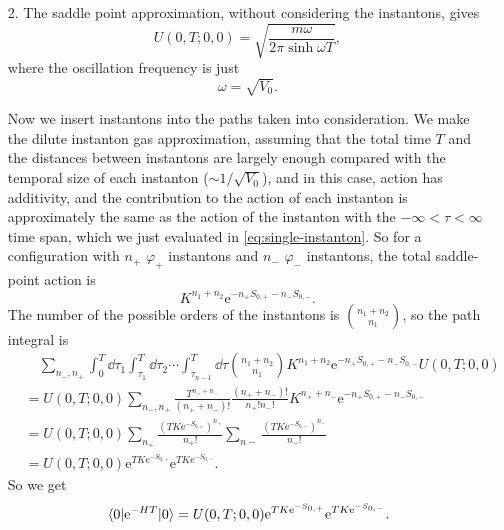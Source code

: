 \documentclass[hyperref, a4paper]{article}
\newcommand*{\ee}{\mathrm{e}}
\begin{document}
\begin{itemize}
\item[2.] The saddle point approximation, without considering the instantons, gives 
\begin{equation}
    U(0, T; 0, 0) = \sqrt{\frac{m \omega}{2 \pi \sinh \omega T}},
\end{equation}
where the oscillation frequency is just 
\begin{equation}
    \omega = \sqrt{V_0}.
\end{equation}

Now we insert instantons into the paths taken into consideration.
We make the dilute instanton gas approximation,
assuming that the total time $T$ and the distances between instantons 
are largely enough compared with the temporal size of each instanton ($\sim 1 / \sqrt{V_0}$),
and in this case, action has additivity,
and the contribution to the action of each instanton 
is approximately the same as the action of the instanton with
the $-\infty < \tau < \infty$ time span,
which we just evaluated in \eqref{eq:single-instanton}.
So for a configuration with $n_+$ $\varphi_+$ instantons and $n_-$ $\varphi_-$ instantons,
the total saddle-point action is 
\[
    K^{n_1 + n_2} \ee^{- n_+ S_{0, +} - n_- S_{0, -}}.
\]
The number of the possible orders of the instantons is $\binom{n_1 + n_2}{n_1}$,
so the path integral is 
\[
    \begin{aligned}
        &\quad \sum_{n_-, n_+} 
        \int_{0}^T \dd{\tau_1} \int_{\tau_1}^T \dd{\tau_2} \cdots \int_{\tau_{n-1}}^T \dd{\tau}
        \binom{n_1 + n_2}{n_1} K^{n_1 + n_2} \ee^{- n_+ S_{0, +} - n_- S_{0, -}}
        U(0, T; 0, 0) \\
        &= U(0, T; 0, 0) \sum_{n_-, n_+} \frac{T^{n_+ + n_-}}{(n_+ + n_-) !} 
        \frac{(n_+ + n_-) !}{n_+! n_-!} 
        K^{n_+ + n_-} \ee^{- n_+ S_{0, +} - n_- S_{0, -}} \\
        &= U(0, T; 0, 0) \sum_{n_+} \frac{(T K \ee^{- S_{0, +}})^{n_+}}{n_+!} 
        \sum_{n-} \frac{(T K \ee^{- S_{0, -}})^{n_-}}{n_-!} \\
        &= U(0, T; 0, 0) \ee^{TK \ee^{- S_{0,+}}} \ee^{TK \ee^{- S_{0,-}}}.
    \end{aligned}
\]
So we get 
\begin{equation}
    \expval{\ee^{- H T}}{0} = U(0, T; 0, 0) \ee^{TK \ee^{- S_{0,+}}} \ee^{TK \ee^{- S_{0,-}}}.
\end{equation}


\end{itemize}
\end{document}
